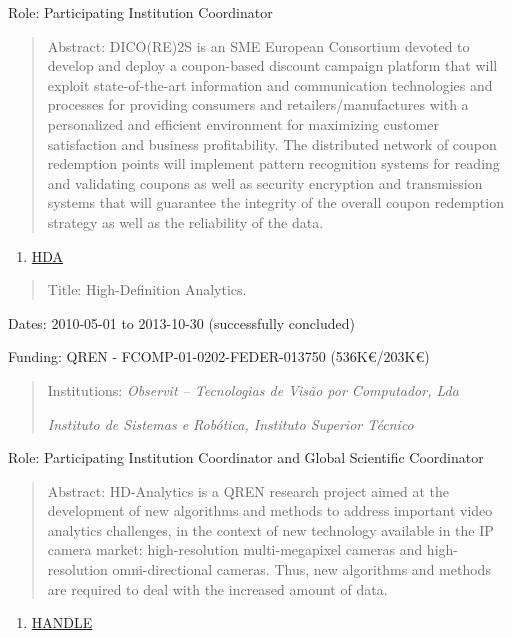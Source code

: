 \documentclass[
]{article}
\begin{document}
Role: Participating Institution Coordinator

\begin{quote}
Abstract: DICO(RE)2S is an SME European Consortium devoted to develop
and deploy a coupon-based discount campaign platform that will exploit
state-of-the-art information and communication technologies and
processes for providing consumers and retailers/manufactures with a
personalized and efficient environment for maximizing customer
satisfaction and business profitability. The distributed network of
coupon redemption points will implement pattern recognition systems for
reading and validating coupons as well as security encryption and
transmission systems that will guarantee the integrity of the overall
coupon redemption strategy as well as the reliability of the data.
\end{quote}

\begin{enumerate}
\def\labelenumi{\arabic{enumi}.}
\setcounter{enumi}{5}
\item
  \ul{HDA}
\end{enumerate}

\begin{quote}
Title: High-Definition Analytics.
\end{quote}

Dates: 2010-05-01 to 2013-10-30 (successfully concluded)

Funding: QREN - FCOMP-01-0202-FEDER-013750 (536K€/203K€)

\begin{quote}
Institutions: \emph{Observit -- Tecnologias de Visão por Computador,
Lda}

\emph{Instituto de Sistemas e Robótica, Instituto Superior Técnico}
\end{quote}

Role: Participating Institution Coordinator and Global Scientific
Coordinator

\begin{quote}
Abstract: HD-Analytics is a QREN research project aimed at the
development of new algorithms and methods to address important video
analytics challenges, in the context of new technology available in the
IP camera market: high-resolution multi-megapixel cameras and
high-resolution omni-directional cameras. Thus, new algorithms and
methods are required to deal with the increased amount of data.
\end{quote}

\begin{enumerate}
\def\labelenumi{\arabic{enumi}.}
\setcounter{enumi}{6}
\item
  \ul{HANDLE}
\end{enumerate}
\end{document}
